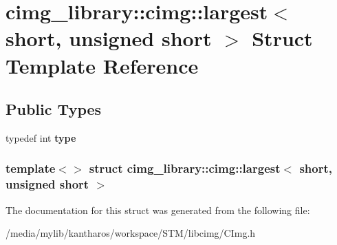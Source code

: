 \hypertarget{structcimg__library_1_1cimg_1_1largest_3_01short_00_01unsigned_01short_01_4}{
\section{cimg\_\-library::cimg::largest$<$ short, unsigned short $>$ Struct Template Reference}
\label{structcimg__library_1_1cimg_1_1largest_3_01short_00_01unsigned_01short_01_4}
}
\subsection*{Public Types}
\begin{DoxyCompactItemize}
\item 
\hypertarget{structcimg__library_1_1cimg_1_1largest_3_01short_00_01unsigned_01short_01_4_ac285c90a54726233849ed581e891cd77}{
typedef int {\bfseries type}}
\label{structcimg__library_1_1cimg_1_1largest_3_01short_00_01unsigned_01short_01_4_ac285c90a54726233849ed581e891cd77}

\end{DoxyCompactItemize}
\subsubsection*{template$<$$>$ struct cimg\_\-library::cimg::largest$<$ short, unsigned short $>$}



The documentation for this struct was generated from the following file:\begin{DoxyCompactItemize}
\item 
/media/mylib/kantharos/workspace/STM/libcimg/CImg.h\end{DoxyCompactItemize}
